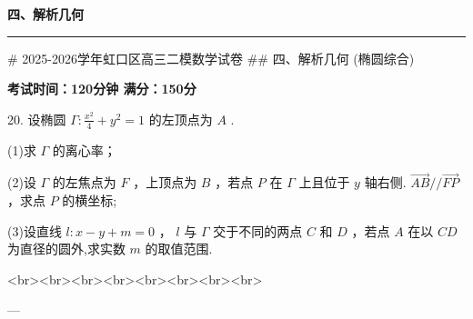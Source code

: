 \documentclass[11pt,a4paper]{article}
\begin{document}
{\centering\Large\bfseries 四、解析几何\par}
\vspace{0.3em}
\hrule
\vspace{0.5em}

# 2025-2026学年虹口区高三二模数学试卷
## 四、解析几何
(椭圆综合)


\textbf{考试时间：120分钟  满分：150分}


20. 设椭圆 $\Gamma  : \frac{{x}^{2}}{4} + {y}^{2} = 1$ 的左顶点为 $A$ .

(1)求 $\Gamma$ 的离心率；

(2)设 $\Gamma$ 的左焦点为 $F$ ，上顶点为 $B$ ，若点 $P$ 在 $\Gamma$ 上且位于 $y$ 轴右侧. $\overrightarrow{AB}//\overrightarrow{FP}$ ，求点 $P$ 的横坐标;

(3)设直线 $l : x - y + m = 0$ ， $l$ 与 $\Gamma$ 交于不同的两点 $C$ 和 $D$ ，若点 $A$ 在以 ${CD}$ 为直径的圆外,求实数 $m$ 的取值范围.




<br><br><br><br><br><br><br><br>


---
\end{document}
